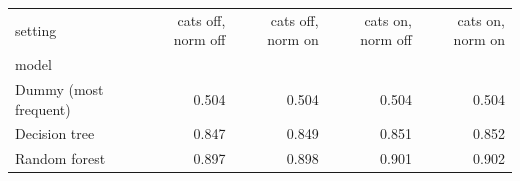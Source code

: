 \begin{tabular}{lrrrr}
\toprule
setting & cats off, norm off & cats off, norm on & cats on, norm off & cats on, norm on \\
model &  &  &  &  \\
\midrule
Dummy (most frequent) & 0.504 & 0.504 & 0.504 & 0.504 \\
Decision tree & 0.847 & 0.849 & 0.851 & 0.852 \\
Random forest & 0.897 & 0.898 & 0.901 & 0.902 \\
\bottomrule
\end{tabular}
